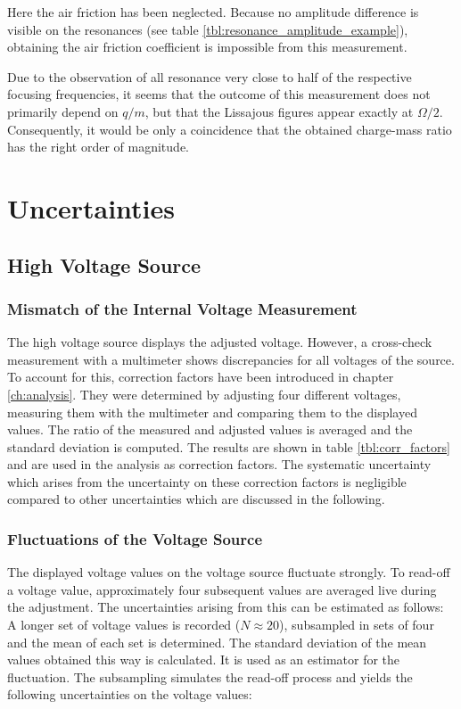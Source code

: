 \documentclass[
	paper=A4,
	parskip=full,
	chapterprefix=true,
	11pt,
	headings=normal,
	bibliography=totoc,
	listof=totoc,
	titlepage=on,
]{scrreprt}
\begin{document}
Here the air friction has been neglected. Because no amplitude difference is visible on the resonances (see table \ref{tbl:resonance_amplitude_example}), obtaining the air friction coefficient is impossible from this measurement.

Due to the observation of all resonance very close to half of the respective focusing frequencies, it seems that the outcome of this measurement does not primarily depend on $q/m$, but that the Lissajous figures appear exactly at $\Omega/2$. Consequently, it would be only a coincidence that the obtained charge-mass ratio has the right order of magnitude.

\chapter{Uncertainties}
\label{ch:systematics}
\section{High Voltage Source}
\subsection{Mismatch of the Internal Voltage Measurement}
The high voltage source displays the adjusted voltage. However, a cross-check measurement with a multimeter shows discrepancies for all voltages of the source. To account for this, correction factors have been introduced in chapter \ref{ch:analysis}. They were determined by adjusting four different voltages, measuring them with the multimeter and comparing them to the displayed values. The ratio of the measured and adjusted values is averaged and the standard deviation is computed. The results are shown in table \ref{tbl:corr_factors} and are used in the analysis as correction factors. The systematic uncertainty which arises from the uncertainty on these correction factors is negligible compared to other uncertainties which are discussed in the following.

\subsection{Fluctuations of the Voltage Source}
The displayed voltage values on the voltage source fluctuate strongly. To read-off a voltage value, approximately four subsequent values are averaged live during the adjustment. The uncertainties arising from this can be estimated as follows: A longer set of voltage values is recorded ($N\approx20$), subsampled in sets of four and the mean of each set is determined. The standard deviation of the mean values obtained this way is calculated. It is used as an estimator for the fluctuation. The subsampling simulates the read-off process and yields the following uncertainties on the voltage values:
\end{document}
